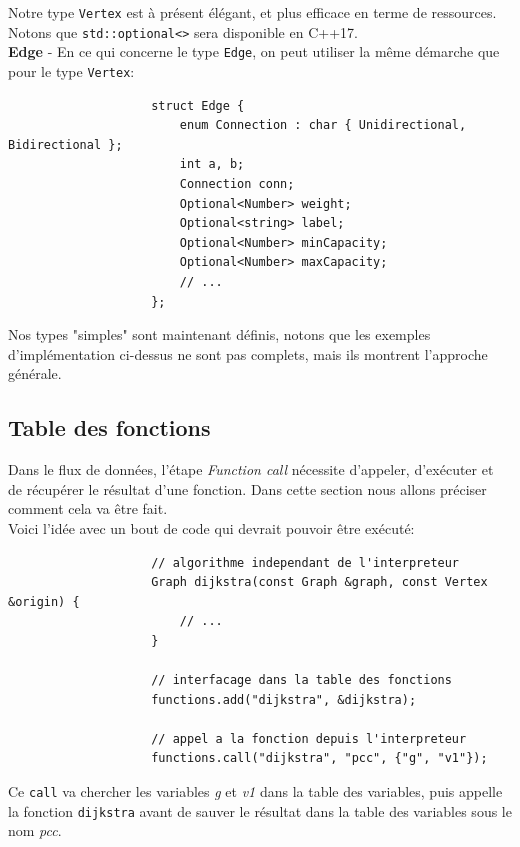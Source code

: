 \documentclass[french]{article}
\begin{document}
				Notre type \texttt{Vertex} est à présent élégant, et plus efficace en terme de ressources. Notons que \texttt{std::optional<>} sera disponible en C++17.\\
				
				\textbf{Edge} - En ce qui concerne le type \texttt{Edge}, on peut utiliser la même démarche que pour le type \texttt{Vertex}:
				
				\begin{lstlisting}
					struct Edge {
						enum Connection : char { Unidirectional, Bidirectional };
						int a, b;
						Connection conn;
						Optional<Number> weight;
						Optional<string> label;
						Optional<Number> minCapacity;
						Optional<Number> maxCapacity;
						// ...
					};
				\end{lstlisting}
				
				Nos types "simples" sont maintenant définis, notons que les exemples d'implémentation ci-dessus ne sont pas complets, mais ils montrent l'approche générale.
				
		\subsection{Table des fonctions}
			\label{subsec:table-des-fonctions}
			Dans le flux de données, l'étape \textit{Function call} nécessite d'appeler, d'exécuter et de récupérer le résultat d'une fonction. Dans cette section nous allons préciser comment cela va être fait.\\
			
			Voici l'idée avec un bout de code qui devrait pouvoir être exécuté:
			
			\begin{lstlisting}
					// algorithme independant de l'interpreteur
					Graph dijkstra(const Graph &graph, const Vertex &origin) {
						// ...
					}
			
					// interfacage dans la table des fonctions
					functions.add("dijkstra", &dijkstra);
					
					// appel a la fonction depuis l'interpreteur
					functions.call("dijkstra", "pcc", {"g", "v1"});
			\end{lstlisting}
			
			Ce \texttt{call} va chercher les variables \textit{g} et \textit{v1} dans la table des variables, puis appelle la fonction \texttt{dijkstra} avant de sauver le résultat dans la table des variables sous le nom \textit{pcc}.\\
			
\end{document}
